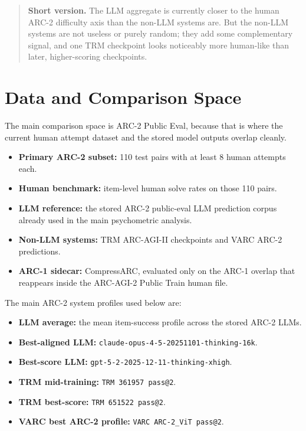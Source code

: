 \documentclass[11pt,letterpaper]{article}
\begin{document}
\begin{quote}
\textbf{Short version.} The LLM aggregate is currently closer to the human ARC-2 difficulty axis than the non-LLM systems are. But the non-LLM systems are not useless or purely random; they add some complementary signal, and one TRM checkpoint looks noticeably more human-like than later, higher-scoring checkpoints.
\end{quote}

\section{Data and Comparison Space}

The main comparison space is ARC-2 Public Eval, because that is where the current human attempt dataset and the stored model outputs overlap cleanly.

\begin{itemize}
    \item \textbf{Primary ARC-2 subset:} 110 test pairs with at least 8 human attempts each.
    \item \textbf{Human benchmark:} item-level human solve rates on those 110 pairs.
    \item \textbf{LLM reference:} the stored ARC-2 public-eval LLM prediction corpus already used in the main psychometric analysis.
    \item \textbf{Non-LLM systems:} TRM ARC-AGI-II checkpoints and VARC ARC-2 predictions.
    \item \textbf{ARC-1 sidecar:} CompressARC, evaluated only on the ARC-1 overlap that reappears inside the ARC-AGI-2 Public Train human file.
\end{itemize}

The main ARC-2 system profiles used below are:

\begin{itemize}
    \item \textbf{LLM average:} the mean item-success profile across the stored ARC-2 LLMs.
    \item \textbf{Best-aligned LLM:} \texttt{claude-opus-4-5-20251101-thinking-16k}.
    \item \textbf{Best-score LLM:} \texttt{gpt-5-2-2025-12-11-thinking-xhigh}.
    \item \textbf{TRM mid-training:} \texttt{TRM 361957 pass@2}.
    \item \textbf{TRM best-score:} \texttt{TRM 651522 pass@2}.
    \item \textbf{VARC best ARC-2 profile:} \texttt{VARC ARC-2\_ViT pass@2}.
\end{itemize}
\end{document}
